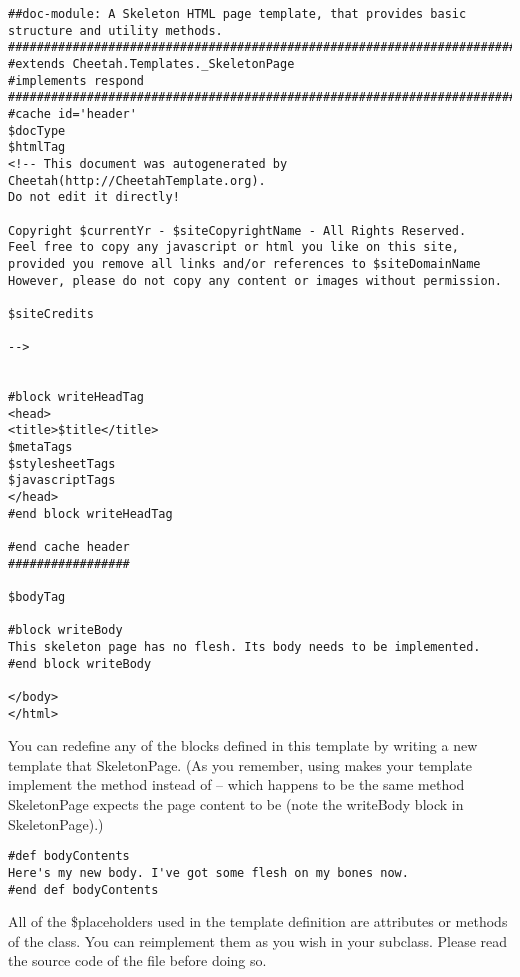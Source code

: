 \begin{verbatim}
##doc-module: A Skeleton HTML page template, that provides basic structure and utility methods.
################################################################################
#extends Cheetah.Templates._SkeletonPage
#implements respond
################################################################################
#cache id='header'
$docType
$htmlTag
<!-- This document was autogenerated by Cheetah(http://CheetahTemplate.org). 
Do not edit it directly!

Copyright $currentYr - $siteCopyrightName - All Rights Reserved.
Feel free to copy any javascript or html you like on this site,
provided you remove all links and/or references to $siteDomainName
However, please do not copy any content or images without permission.

$siteCredits

-->


#block writeHeadTag
<head>
<title>$title</title>
$metaTags 
$stylesheetTags 
$javascriptTags
</head>
#end block writeHeadTag

#end cache header
#################

$bodyTag

#block writeBody
This skeleton page has no flesh. Its body needs to be implemented.
#end block writeBody

</body>
</html>
\end{verbatim}

You can redefine any of the blocks defined in this template by writing a new
template that  SkeletonPage.  (As you remember, using 
 makes your template implement the 
method instead of  -- which happens to be the same method
SkeletonPage expects the page content to be (note the writeBody block in
SkeletonPage).)

\begin{verbatim}
#def bodyContents
Here's my new body. I've got some flesh on my bones now.
#end def bodyContents
\end{verbatim}


All of the \$placeholders used in the  template definition
are attributes or methods of the  class.  You can reimplement
them as you wish in your subclass.  Please read the source code of the file
 before doing so.  

